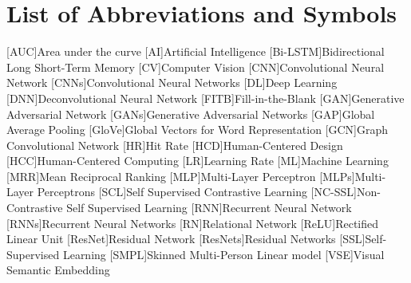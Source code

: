 \documentclass[a4paper,12pt,twoside]{scrreprt}
\begin{document}
\newpage


\newpage


\cleardoublepage
\tableofcontents

\clearpage
{}
{}
\listoffigures

\clearpage
{}
{}
\listoftables

\clearpage
{}
{}
\chapter*{List of Abbreviations and Symbols}
\begin{acronym}[ML]
 [AUC]{Area under the curve}
 [AI]{Artificial Intelligence}
 [Bi-LSTM]{Bidirectional Long Short-Term Memory}
 [CV]{Computer Vision}
 [CNN]{Convolutional Neural Network}
 [CNNs]{Convolutional Neural Networks}
 [DL]{Deep Learning}
 [DNN]{Deconvolutional Neural Network}
 [FITB]{Fill-in-the-Blank}
 [GAN]{Generative Adversarial Network}
 [GANs]{Generative Adversarial Networks}
 [GAP]{Global Average Pooling}
 [GloVe]{Global Vectors for Word Representation}
 [GCN]{Graph Convolutional Network}
 [HR]{Hit Rate}
 [HCD]{Human-Centered Design}
 [HCC]{Human-Centered Computing}
 [LR]{Learning Rate}
 [ML]{Machine Learning}
 [MRR]{Mean Reciprocal Ranking}
 [MLP]{Multi-Layer Perceptron}
 [MLPs]{Multi-Layer Perceptrons}
 [SCL]{Self Supervised Contrastive Learning}
 [NC-SSL]{Non-Contrastive Self Supervised Learning}
 [RNN]{Recurrent Neural Network}
 [RNNs]{Recurrent Neural Networks}
 [RN]{Relational Network}
 [ReLU]{Rectified Linear Unit}
 [ResNet]{Residual Network}
 [ResNets]{Residual Networks}
 [SSL]{Self-Supervised Learning}
 [SMPL]{Skinned Multi-Person Linear model}
 [VSE]{Visual Semantic Embedding}
\end{acronym}







\end{document}
